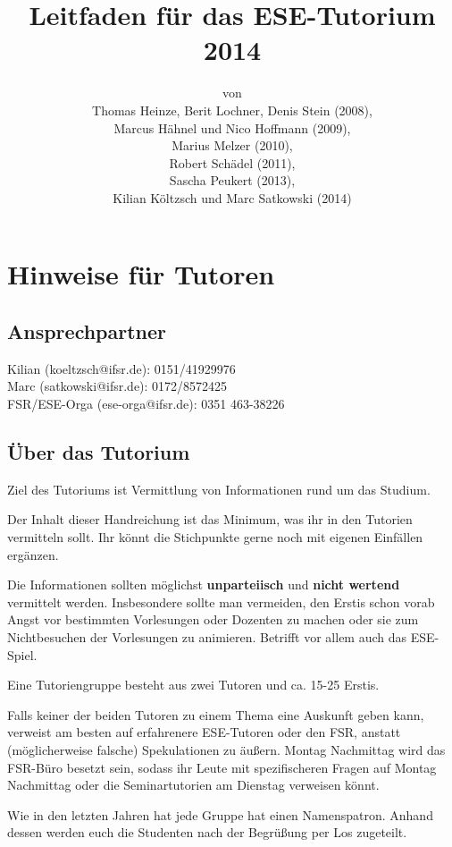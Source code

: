 \documentclass[a4paper,12pt]{report}
\begin{document}
\title{Leitfaden für das ESE-Tutorium 2014\\}
\date{}
\author{von\\Thomas Heinze, Berit Lochner, Denis Stein (2008), \\Marcus Hähnel und Nico Hoffmann (2009), \\Marius Melzer (2010), \\Robert Schädel (2011),\\Sascha Peukert (2013), \\Kilian Költzsch und Marc Satkowski (2014)}
\maketitle

\chapter{Hinweise für Tutoren}
\section{Ansprechpartner}
Kilian (koeltzsch@ifsr.de): 0151/41929976\\
Marc (satkowski@ifsr.de): 0172/8572425 \\
FSR/ESE-Orga (ese-orga@ifsr.de): 0351 463-38226

\section{Über das Tutorium}
\begin{itemize*}
\item Ziel des Tutoriums ist Vermittlung von Informationen rund um das Studium.
\item Der Inhalt dieser Handreichung ist das Minimum, was ihr in den Tutorien vermitteln sollt. Ihr könnt die Stichpunkte gerne noch mit eigenen Einfällen ergänzen.
\item Die Informationen sollten möglichst \textbf{unparteiisch} und \textbf{nicht wertend} vermittelt werden. Insbesondere sollte man vermeiden, den Erstis schon vorab Angst vor bestimmten Vorlesungen oder Dozenten zu machen oder sie zum Nichtbesuchen der Vorlesungen zu animieren. Betrifft vor allem auch das ESE-Spiel.
\item Eine Tutoriengruppe besteht aus zwei Tutoren und ca. 15-25 Erstis.
\item Falls keiner der beiden Tutoren zu einem Thema eine Auskunft geben kann, verweist am besten auf erfahrenere ESE-Tutoren oder den FSR, anstatt (möglicherweise falsche) Spekulationen zu äußern. Montag Nachmittag wird das FSR-Büro besetzt sein, sodass ihr Leute mit spezifischeren Fragen auf Montag Nachmittag oder die Seminartutorien am Dienstag verweisen könnt.
\item Wie in den letzten Jahren hat jede Gruppe hat einen Namenspatron. Anhand dessen werden euch die Studenten nach der Begrüßung per Los zugeteilt.
\end{itemize*}
\end{document}
